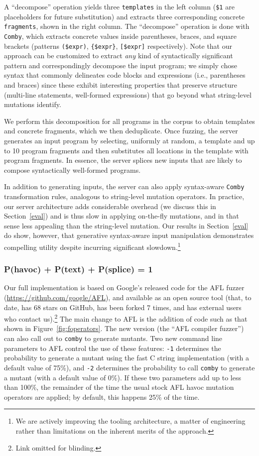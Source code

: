 A ``decompose'' operation yields three \texttt{templates} in the left column
({\tt\color{dkgreen}\$1} are placeholders for future substitution) and extracts
three corresponding concrete \texttt{fragments}, shown in the right column. 
The ``decompose'' operation is done with \texttt{Comby}, which extracts concrete
values inside parentheses, braces, and square brackets (patterns
\texttt{(\$expr)}, \texttt{\{\$expr\}}, \texttt{[\$expr]} respectively). Note
that our approach can be customized to extract \emph{any} kind of syntactically
significant pattern and correspondingly decompose the input program; we simply
chose syntax that commonly delineates code blocks and expressions (i.e.,
parentheses and braces) since these exhibit interesting properties that
preserve structure (multi-line statements, well-formed expressions) that go
beyond what string-level mutations identify.

We perform this decomposition for all programs in the corpus to obtain
templates and concrete fragments, which we then deduplicate. Once fuzzing, the
server generates an input program by selecting, uniformly at random, a template
and up to 10 program fragments and then substitutes all locations in the
template with program fragments. In essence, the server splices new inputs that
are likely to compose syntactically well-formed programs.

In addition to generating inputs, the server can also apply syntax-aware
\texttt{Comby} transformation rules, analogous to string-level mutation
operators. In practice, our server architecture adds considerable overhead (we
discuss this in Section~\ref{eval}) and is thus slow in applying
on-the-fly mutations, and in that sense less
appealing than the string-level mutation. Our
results in Section~\ref{eval} do show, however, that generative
syntax-aware input manipulation demonstrates compelling utility despite
incurring significant slowdown.\footnote{We are actively improving the tooling
architecture, a matter of engineering rather than
limitations on the inherent merits of the approach.}

\subsubsection{P(havoc) + P(text) + P(splice) = 1}

Our full implementation is based on Google's released code for the AFL
fuzzer (\url{https://github.com/google/AFL}), and available as an open source tool (that, to date, has 68
stars on GitHub, has been forked 7 times, and has external users who
contact us).\footnote{Link omitted for
  blinding.}  The main change to AFL is the addition of code such as that shown in
Figure~\ref{fig:foperators}.  The new version (the ``AFL compiler
fuzzer'') can also call out to {\tt comby} to generate mutants.  Two
new command line parameters to AFL control the use of these features:
{\tt -1} determines the probability to generate a mutant using the
fast C string implementation (with a default value of 75\%), and {\tt -2} determines the probability
to call {\tt comby} to generate a mutant (with a default value of
0\%).  If these two parameters add up to less than 100\%, the
remainder of the time the usual stock AFL havoc mutation operators are
applied; by default, this happens 25\% of the time.
